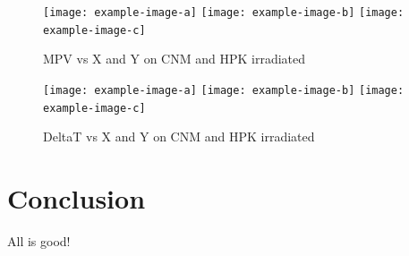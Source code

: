 \documentclass[preprint,1p]{elsarticle}
\begin{document}
\begin{figure}[htbp] 
\centering
\texttt{[image: example-image-a]} 
\texttt{[image: example-image-b]} 
\texttt{[image: example-image-c]} 
\caption{MPV vs X and Y on CNM and HPK irradiated} 
\label{fig:Sensors} 
\end{figure}


\begin{figure}[htbp] 
\centering
\texttt{[image: example-image-a]} 
\texttt{[image: example-image-b]} 
\texttt{[image: example-image-c]} 
\caption{DeltaT vs X and Y on CNM and HPK irradiated} 
\label{fig:Sensors} 
\end{figure} 
 


\section{Conclusion}
\label{sec:conclusion} 

All is good!





{}
 




\end{document}
